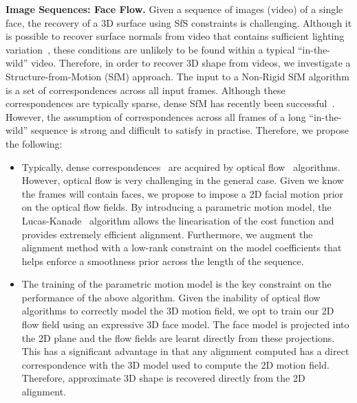 \textbf{Image Sequences: Face Flow.} Given a sequence of images (video) of
a single face, the recovery of a 3D surface using SfS constraints is
challenging. Although it is possible to recover surface normals
from video that contains sufficient lighting variation~\cite{brostow2011video,wenger2005performance,ma2007rapid,jones2011head}, these conditions are unlikely to be found within a typical
``in-the-wild'' video. Therefore, in order to recover 3D shape from videos,
we investigate a Structure-from-Motion (SfM) approach. The input to a 
Non-Rigid SfM algorithm is a set of correspondences across all input frames. 
Although these correspondences are typically sparse, dense SfM has recently been
successful~\cite{garg2013dense,newcombe2011dtam,agudo2014online,fragkiadaki2014grouping}.
However, the assumption of correspondences across all frames of a long 
``in-the-wild'' sequence is strong and difficult to satisfy in practise. 
Therefore, we propose the following:
\begin{itemize}
	\item Typically, dense correspondences~\cite{Garrido:2014gn,agudo2014online} 
	      are acquired by optical flow~\cite{gibson1950perception,horn1981determining} 
	      algorithms. However, optical flow is very challenging in the general
	      case. Given we know the frames will contain faces, we propose to
	      impose a 2D facial motion prior on the optical flow fields. By
	      introducing a parametric motion model, the Lucas-Kanade~\cite{lucas1981iterative} 
	      algorithm allows the linearisation of the cost function and provides
	      extremely efficient alignment.
	      Furthermore, we augment the alignment method with a low-rank
	      constraint on the model coefficients that helps enforce a smoothness
	      prior across the length of the sequence.
	\item The training of the parametric motion model is the key constraint
	      on the performance of the above algorithm. Given the inability
	      of optical flow algorithms to correctly model the 3D motion field,
	      we opt to train our 2D flow field using an expressive 3D face model.
	      The face model is projected into the 2D plane and the flow fields
	      are learnt directly from these projections. This has a significant
	      advantage in that any alignment computed has a direct correspondence
	      with the 3D model used to compute the 2D motion field. Therefore,
	      approximate 3D shape is recovered directly from the 2D alignment.
\end{itemize}
